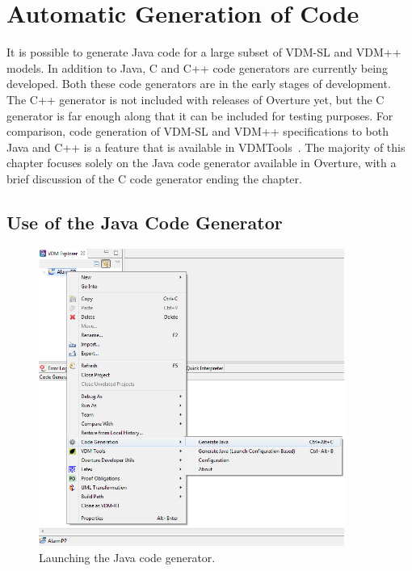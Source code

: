 
\newcommand{\vdmkw}[1]{\texttt{\textbf{#1}}}
\chapter{Automatic Generation of Code}\label{sec:codegen}

It is possible to generate Java code for a large subset of VDM-SL and VDM++ models.
%
In addition to Java, C and C++ code generators are currently being developed.
%
Both these code generators are in the early stages of development.
%
The C++ generator is not included with releases of Overture yet, but the C generator is far enough along that it can be included for testing purposes.
%
For comparison, code generation of VDM-SL and VDM++ specifications to both Java and C++ is a feature that is available in VDMTools~\cite{Java2VDMMan,CGMan,CGManPP}.
%
The majority of this chapter focuses solely on the Java code generator available in Overture, with a brief discussion of the C code generator ending the chapter.

\section{Use of the Java Code Generator}
\label{sec:javacg_use}

\begin{figure}[htbp]
\begin{center}
\includegraphics[width=10cm]{screenDumps/javacg_menu}
\caption{Launching the Java code generator.\label{fig:javacg_menu}}
\end{center}
\end{figure}

